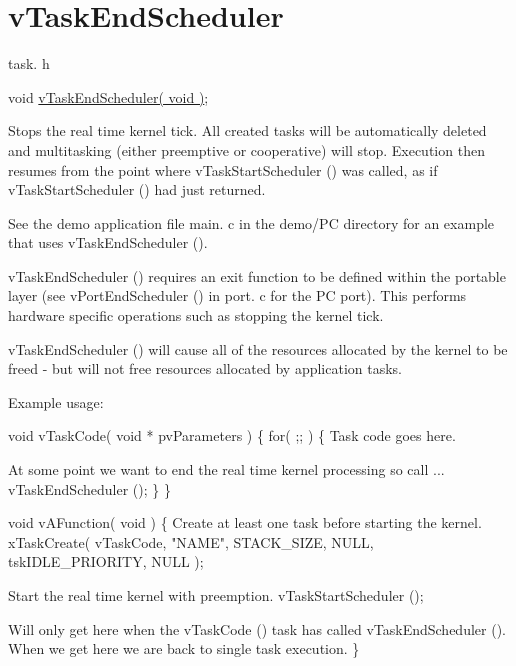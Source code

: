 \hypertarget{group__v_task_end_scheduler}{\section{v\-Task\-End\-Scheduler}
\label{group__v_task_end_scheduler}
}
task. h 
\begin{DoxyPre}void \hyperlink{win32_2win32_2_libraries_2_free_r_t_o_s_2_source_2tasks_8c_aeadc53d3d0d0ea3a6c7702a9eacbf452}{vTaskEndScheduler( void )};\end{DoxyPre}


Stops the real time kernel tick. All created tasks will be automatically deleted and multitasking (either preemptive or cooperative) will stop. Execution then resumes from the point where v\-Task\-Start\-Scheduler () was called, as if v\-Task\-Start\-Scheduler () had just returned.

See the demo application file main. c in the demo/\-P\-C directory for an example that uses v\-Task\-End\-Scheduler ().

v\-Task\-End\-Scheduler () requires an exit function to be defined within the portable layer (see v\-Port\-End\-Scheduler () in port. c for the P\-C port). This performs hardware specific operations such as stopping the kernel tick.

v\-Task\-End\-Scheduler () will cause all of the resources allocated by the kernel to be freed -\/ but will not free resources allocated by application tasks.

Example usage\-: 
\begin{DoxyPre}
 void vTaskCode( void * pvParameters )
 \{
         for( ;; )
         \{
Task code goes here.\end{DoxyPre}



\begin{DoxyPre}At some point we want to end the real time kernel processing
so call ...
                 vTaskEndScheduler ();
         \}
 \}\end{DoxyPre}



\begin{DoxyPre} void vAFunction( void )
 \{
Create at least one task before starting the kernel.
         xTaskCreate( vTaskCode, "NAME", STACK\_SIZE, NULL, tskIDLE\_PRIORITY, NULL );\end{DoxyPre}



\begin{DoxyPre}Start the real time kernel with preemption.
         vTaskStartScheduler ();\end{DoxyPre}



\begin{DoxyPre}Will only get here when the vTaskCode () task has called
vTaskEndScheduler ().  When we get here we are back to single task
execution.
 \}
   \end{DoxyPre}
 
